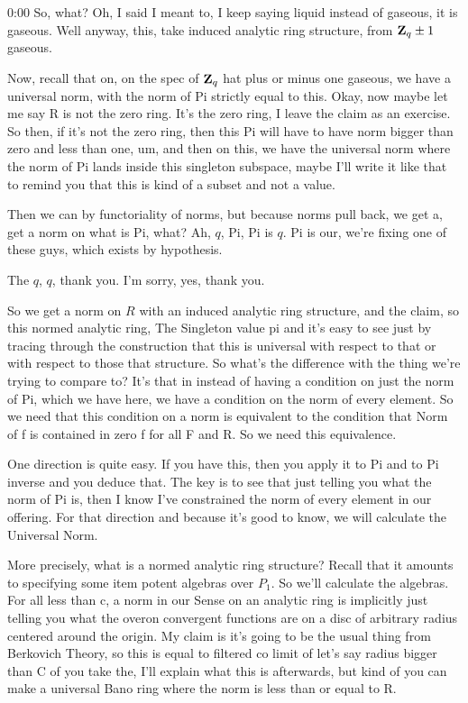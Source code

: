 \begin{unfinished}{0:00}
So, what? Oh, I said I meant to, I keep saying liquid instead of gaseous, it is gaseous. Well anyway, this, take induced analytic ring structure, from $\mathbf Z_q \pm 1$ gaseous.

Now, recall that on, on the spec of $\mathbf Z_q$ hat plus or minus one gaseous, we have a universal norm, with the norm of Pi strictly equal to this. Okay, now maybe let me say R is not the zero ring. It's the zero ring, I leave the claim as an exercise. So then, if it's not the zero ring, then this Pi will have to have norm bigger than zero and less than one, um, and then on this, we have the universal norm where the norm of Pi lands inside this singleton subspace, maybe I'll write it like that to remind you that this is kind of a subset and not a value.

Then we can by functoriality of norms, but because norms pull back, we get a, get a norm on what is Pi, what? Ah, $q$, Pi, Pi is $q$. Pi is our, we're fixing one of these guys, which exists by hypothesis.

The $q$, $q$, thank you. I'm sorry, yes, thank you.

So we get a norm on $R$ with an induced analytic ring structure, and the claim, so this normed analytic ring,
The Singleton value pi and it's easy to see just by tracing through the construction that this is universal with respect to that or with respect to those that structure. So what's the difference with the thing we're trying to compare to? It's that in instead of having a condition on just the norm of Pi, which we have here, we have a condition on the norm of every element. So we need that this condition on a norm is equivalent to the condition that Norm of f is contained in zero f for all F and R. So we need this equivalence.

One direction is quite easy. If you have this, then you apply it to Pi and to Pi inverse and you deduce that. The key is to see that just telling you what the norm of Pi is, then I know I've constrained the norm of every element in our offering. For that direction and because it's good to know, we will calculate the Universal Norm.

More precisely, what is a normed analytic ring structure? Recall that it amounts to specifying some item potent algebras over $P_1$. So we'll calculate the algebras. For all less than c, a norm in our Sense on an analytic ring is implicitly just telling you what the overon convergent functions are on a disc of arbitrary radius centered around the origin. My claim is it's going to be the usual thing from Berkovich Theory, so this is equal to filtered co limit of let's say radius bigger than C of you take the, I'll explain what this is afterwards, but kind of you can make a universal Bano ring where the norm is less than or equal to R.


\end{unfinished}
